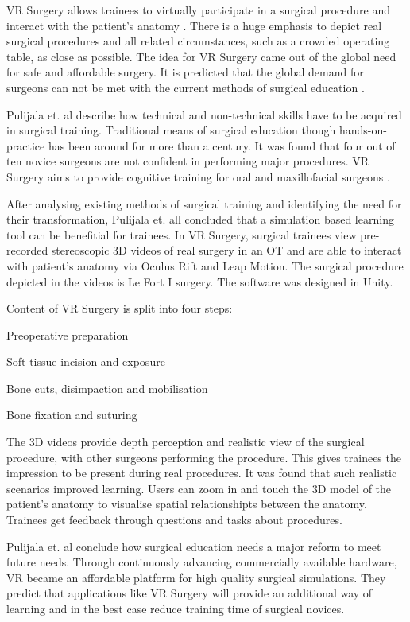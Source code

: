 VR Surgery allows trainees to virtually participate in a surgical procedure and interact with the patient's anatomy \cite{RN6}.
There is a huge emphasis to depict real surgical procedures and all related circumstances, such as a crowded operating table, as close as possible.
The idea for VR Surgery came out of the global need for safe and affordable surgery.
It is predicted that the global demand for surgeons can not be met with the current methods of surgical education \cite{RN68}.

Pulijala et. al describe how technical and non-technical skills have to be acquired in surgical training.
Traditional means of surgical education though hands-on-practice has been around for more than a century.
It was found that four out of ten novice surgeons are not confident in performing major procedures.
VR Surgery aims to provide cognitive training for oral and maxillofacial surgeons \cite{RN68}.

After analysing existing methods of surgical training and identifying the need for their transformation,
Pulijala et. all concluded that a simulation based learning tool can be benefitial for trainees.
In VR Surgery, surgical trainees view pre-recorded stereoscopic 3D videos of real surgery in an OT and are able to interact with patient's anatomy via Oculus Rift and Leap Motion.
The surgical procedure depicted in the videos is Le Fort I surgery.
The software was designed in Unity.

Content of VR Surgery is split into four steps:
\begin{compactenum}[label=(\alph*)]
    \item Preoperative preparation
    \item Soft tissue incision and exposure
    \item Bone cuts, disimpaction and mobilisation
    \item Bone fixation and suturing
\end{compactenum}

The 3D videos provide depth perception and realistic view of the surgical procedure, with other surgeons performing the procedure.
This gives trainees the impression to be present during real procedures. It was found that such realistic scenarios improved learning.
Users can zoom in and touch the 3D model of the patient's anatomy to visualise spatial relationshipts between the anatomy.
Trainees get feedback through questions and tasks about procedures.

Pulijala et. al conclude how surgical education needs a major reform to meet future needs.
Through continuously advancing commercially available hardware, VR became an affordable platform for high quality surgical simulations.
They predict that applications like VR Surgery will provide an additional way of learning and in the best case reduce training time of surgical novices.


